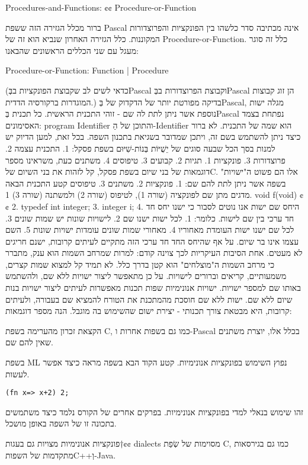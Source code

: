       Procedures-and-Functions:
      {¢¢ Procedure-or-Function }

      ברור מכלל הגזירה הזה ששפת Pascal אינה מכתיבה סדר כלשהו בין הפונקציות והפרוצדורות המקוננות. כלל הגזירה האחרון שנביא הוא זה של Procedure-or-Function. כלל זה סוגר מעגל עם שני הכללים הראשונים שהבאנו:

      Procedure-or-Function:
      Function | Procedure

      (כדאי לשים לב שקבוצת הפונקציות בבְּPascal וקבוצת הפרוצדורות בבְּPascal הן זוג קבוצות המוגדרות ברקורסיה הדדית.)
      בדיקה מפורטת יותר של הדקדוק של בְּPascal, מגלה ישות נוספת אשר ניתן לתת לה שם - זוהי התכנית הראשית. כל תכנית בְּPascal נפתחת בצמד האסימונים: program Identifier והתוכן של הַ-Identifier הוא שמה של התכנית. לא ברור כיצד ניתן להשתמש בשם זה, ויתכן שמדובר בשגיאת בתכנון השפה. בכל זאת, למען הדיוק יש למנות בסך הכל שבעה סוגים של יֵשֻׁיּוֹת בְּנוֹת-שִׁיּוּם בשפת פסקל:
      1. התכנית עצמה
      2. פרוצדורות
      3. פונקציות
      1. תגיות
      2. קבועים
      3. טיפוסים
      4. משתנים
      כעת, משראינו מספר דוגמאות של בני שיום בשפת פסקל, קל לזהות את בני השיום שלC. אלו הם פשוט ה"ישויות" בשפה אשר ניתן לתת להם שם:
      1. פונקציות
      2. משתנים
      3. טיפוסים
      קטע התכנית הבאה מדגים מתן שם לפונקציה (שורה 1), לטיפוס (שורה 2) ולמשתנה (שורה 3)
      1. void f(void) {¢¢
        2. typedef int integer;
        3. integer i;
      4. }
      היחס שם ישות
      אנו נוטים לסבור כי ישנו יחס חד חד ערכי בין שם לישות. כלומר:
      1. לכל ישות ישנו שם
      2. לישויות שונות יש שמות שונים
      3. לכל שם ישנו ישות העומדת מאחוריו
      4. מאחורי שמות שונים עומדות ישויות שונות
      5. השם עצמו אינו בר שיום.
      על אף שהיחס החד חד ערכי הזה מתקיים לעיתים קרובות, ישנם חריגים לא מעטים. אחת הסיבות העיקריות לכך צוינה קודם: למרות שמרחב השמות הוא ענק, מתברר כי מרחב השמות ה"מוצלחים" הוא קטן בדרך כלל. לא תמיד קל למצוא שמות קצרים, משמעותיים, קריאים וברורים לישויות. על כן מתאפשר ליצור ישויות ללא שם, ולהשתמש באותו שם למספר ישויות.
      ישויות אנונימיות
      שפות תכנות מאפשרות לעיתים ליצור ישויות בנות שיום ללא שם. ישות ללא שם חוסכת מהמתכנת את הטורח להמציא שם בעבורה, ולעיתים קרובות, היא מבטאת צורך תכנותי - יצירת ישום שהשימוש בה מוגבל.
      הנה מספר דוגמאות:
      \begin{ציינון}
\item הקצאת זכרון מהערימה בשפת C, כמו גם בשפות אחרות ו-Pascal בכלל אלו, יוצרת משתנים שאין להם שם.
\item בשפת ML נפוץ השימוש בפונקציות אנונימיות. קטע הקוד הבא בשפה מראה כיצד אפשר לעשות.
    \end{ציינון}
\begin{verbatim}
(fn x=> x+2) 2;
\end{verbatim}
   זהו שימוש בנאלי למדי בפונקציות אנונימיות. בפרקים אחרים של הקורס נלמד כיצד משתמשים בתכונה זו של השפה באופן מושכל.
                              \begin{ציינון}
\item פונקציות אנונימיות מצויות גם בעגות†{¢¢ dialects} מסוימות של שְׂפַת C, כמו גם בגירסאות מתקדמות של השפותC++וְ-Java.
                                \end{ציינון}

